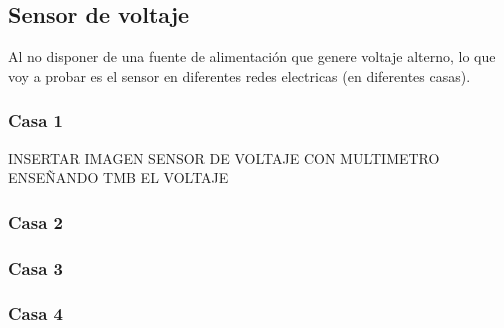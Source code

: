 \begin{titlepage}
\subsection{Sensor de voltaje}
Al no disponer de una fuente de alimentación que genere voltaje alterno, lo que voy a probar es el sensor en diferentes redes electricas (en diferentes casas). \\
\subsubsection{Casa 1}

INSERTAR IMAGEN SENSOR DE VOLTAJE CON MULTIMETRO ENSEÑANDO TMB EL VOLTAJE
\subsubsection{Casa 2}

\subsubsection{Casa 3}

\subsubsection{Casa 4}


\newpage
\end{titlepage}
